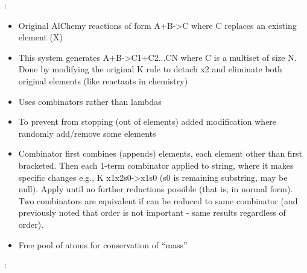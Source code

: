 \autocite{Fenizio2000}:
		
		\begin{itemize}
			\item
			
			Original AlChemy reactions of form A+B-\textgreater{}C where C
			replaces an existing element (X)
			
			\item
			
			This system generates A+B-\textgreater{}C1+C2...CN where C is a
			multiset of size N. Done by modifying the original K rule to detach x2
			and eliminate both original elements (like reactants in chemistry)
			
			\item
			
			Uses combinators rather than lambdas
			
			\item
			
			To prevent from stopping (out of elements) added modification where
			randomly add/remove some elements
			
			\item
			
			Combinator first combines (appends) elements, each element other than
			first bracketed. Then each 1-term combinator applied to string, where
			it makes specific changes e.g., K x1x2s0-\textgreater{}x1s0 (s0 is
			remaining substring, may be null). Apply until no further reductions
			possible (that is, in normal form). Two combinators are equivalent if
			can be reduced to same combinator (and previously noted that order is
			not important - same results regardless of order).
			
			\item
			
			Free pool of atoms for conservation of ``mass''
			
		\end{itemize}
		
\autocite{Fenizio2001}:
		
